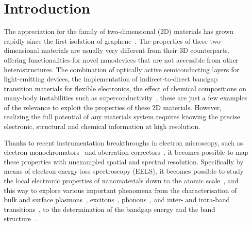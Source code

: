 \section{Introduction}
\label{sec:introduction}

The appreciation for the family of two-dimensional (2D) materials has grown rapidly since the 
first isolation of graphene~\cite{Novoselov:2004}.
%
The properties of these two-dimensional materials are usually very different from their 3D counterparts, 
offering functionalities for novel nanodevices that are not accessible from other heterostructures.
%
The combination of optically active semiconducting layers for light-emitting devices,
the implementation of indirect-to-direct bandgap transition 
materials for flexible electronics, the effect of chemical compositions on many-body instabilities such as
superconductivity~\cite{Novoselov:2016},
%
these are just a few examples of the relevance to exploit the properties of these 2D materials. 
%
However, realizing the full potential of any materials system requires knowing the precise 
electronic, structural and chemical information
at high resolution.

Thanks to recent instrumentation breakthroughs in electron microscopy,
such as electron monochromators~\cite{Terauchi:2005, Freitag:2005} and aberration correctors~\cite{Haider:1998},
it becomes possible to map these properties with unexampled spatial and spectral resolution.
%
Specifically by means of electron energy loss spectroscopy (EELS), it becomes possible to study the local
electronic properties of nanomaterials
down to the atomic scale~\cite{Geiger:1967}, and this way to explore various
important phenomena from the characterisation of bulk and surface plasmons~\cite{Daniels:2003, Schaffer:2008}, 
excitons~\cite{Erni:2005},
phonons~\cite{Ibach:1980}, and inter- and intra-band transitions~\cite{Rafferty:1998},
to the determination of the bandgap energy and the band structure~\cite{Stoger:2008}.

